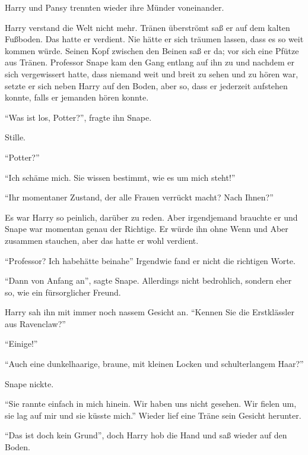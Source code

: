 \onelineback %

\begin{abAchtzehn}
Harry und Pansy trennten wieder ihre Münder voneinander.
\end{abAchtzehn}

\trenn

Harry verstand die Welt nicht mehr. Tränen überströmt saß er auf dem kalten Fußboden. Das hatte er verdient. Nie hätte er sich träumen lassen, dass es so weit kommen würde. Seinen Kopf zwischen den Beinen saß er da; vor sich eine Pfütze aus Tränen. Professor Snape kam den Gang entlang auf ihn zu und nachdem er sich vergewissert hatte, dass niemand weit und breit zu sehen und zu hören war, setzte er sich neben Harry auf den Boden, aber so, dass er jederzeit aufstehen konnte, falls er jemanden hören konnte.

\enquote{Was ist los, Potter?}, fragte ihn Snape.

Stille.

\enquote{Potter?}

\enquote{Ich schäme mich. Sie wissen bestimmt, wie es um mich steht!}

\enquote{Ihr momentaner Zustand, der alle Frauen verrückt macht? Nach Ihnen?}

Es war Harry so peinlich, darüber zu reden. Aber irgendjemand brauchte er und Snape war momentan genau der Richtige. Er würde ihn ohne Wenn und Aber zusammen stauchen, aber das hatte er wohl verdient.

\enquote{Professor? Ich habe\abs hätte beinahe\abs} Irgendwie fand er nicht die richtigen Worte.

\enquote{Dann von Anfang an}, sagte Snape. Allerdings nicht bedrohlich, sondern eher so, wie ein fürsorglicher Freund.

Harry sah ihn mit immer noch nassem Gesicht an. \enquote{Kennen Sie die Erstklässler aus Ravenclaw?}

\enquote{Einige!}

\enquote{Auch eine dunkelhaarige, braune, mit kleinen Locken und schulterlangem Haar?}

Snape nickte.

\enquote{Sie rannte einfach in mich hinein. Wir haben uns nicht gesehen. Wir fielen um, sie lag auf mir und sie küsste mich.} Wieder lief eine Träne sein Gesicht herunter.

\enquote{Das ist doch kein Grund\abs}, doch Harry hob die Hand und saß wieder auf den Boden.


